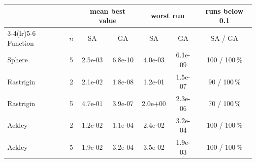 \begin{tabular}{@{}lcccccc@{}}
\toprule
 & & \multicolumn{2}{c}{mean best value} & \multicolumn{2}{c}{worst run} & runs below 0.1 \\
\cmidrule(lr){3-4}\cmidrule(lr){5-6}
Function & $n$ & SA & GA & SA & GA & SA / GA \\
\midrule
Sphere & 5 & 2.5e-03 & 6.8e-10 & 4.0e-03 & 6.1e-09 & 100 / 100\,\% \\
Rastrigin & 2 & 2.1e-02 & 1.8e-08 & 1.2e-01 & 1.5e-07 & 90 / 100\,\% \\
Rastrigin & 5 & 4.7e-01 & 3.9e-07 & 2.0e+00 & 2.3e-06 & 70 / 100\,\% \\
Ackley & 2 & 1.2e-02 & 1.1e-04 & 2.4e-02 & 3.2e-04 & 100 / 100\,\% \\
Ackley & 5 & 1.9e-02 & 3.2e-04 & 3.5e-02 & 1.9e-03 & 100 / 100\,\% \\
\bottomrule
\end{tabular}
